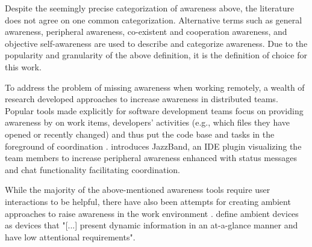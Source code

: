 Despite the seemingly precise categorization of awareness above, the literature does not agree on one common categorization. Alternative terms such as general awareness, peripheral awareness, co-existent and cooperation awareness, and objective self-awareness are used to describe and categorize awareness. Due to the popularity and granularity of the above definition, it is the definition of choice for this work.

To address the problem of missing awareness when working remotely, a wealth of research developed approaches to increase awareness in distributed teams. Popular tools made explicitly for software development teams focus on providing awareness by on work items, developers' activities (e.g., which files they have opened or recently changed) and thus put the code base and tasks in the foreground of coordination \autocite{biehl2007fastdash, jakobsen2009wipdash, eick1992seesoft, deline2005easing}. \textcite{cheng2003jazzing} introduces JazzBand, an IDE plugin visualizing the team members to increase peripheral awareness enhanced with status messages and chat functionality facilitating coordination.

While the majority of the above-mentioned awareness tools require user interactions to be helpful, there have also been attempts for creating ambient approaches to raise awareness in the work environment \autocite{morrison2020facilitating, otjacques2006ambient, downs2012ambient, alavi2012ambient, rocker2004using}. \textcite{downs2012ambient} define ambient devices as devices that "[...] present dynamic information in an at-a-glance manner and have low attentional requirements".

